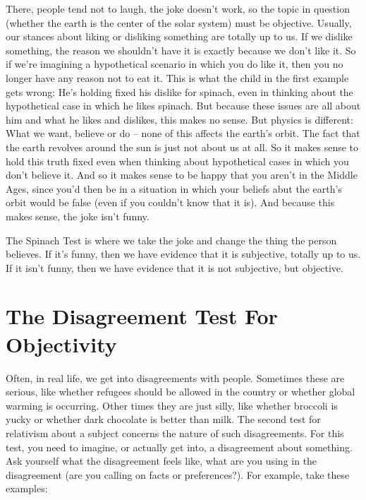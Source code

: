 There, people tend not to laugh, the joke doesn't work, so the topic in question (whether the earth is the center of the solar system) must be objective. Usually, our stances about liking or disliking something are totally up to us. If we dislike something, the reason we shouldn’t have it is exactly because we don’t like it. So if we're imagining a hypothetical scenario in which you do like it, then you no longer have any reason not to eat it. This is what the child in the first example gets wrong: He's holding fixed his dislike for spinach, even in thinking about the hypothetical case in which he likes spinach. But because these issues are all about him and what he likes and dislikes, this makes no sense. But physics is different: What we want, believe or do – none of this affects the earth’s orbit. The fact that the earth revolves around the sun is just not about us at all. So it makes sense to hold this truth fixed even when thinking about hypothetical cases in which you don't believe it. And so it makes sense to be happy that you aren’t in the Middle Ages, since you’d then be in a situation in which your beliefs abut the earth’s orbit would be false (even if you couldn’t know that it is). And because this makes sense, the joke isn't funny.

The Spinach Test is where we take the joke and change the thing the person believes. If it’s funny, then we have evidence that it is subjective, totally up to us. If it isn’t funny, then we have evidence that it is not subjective, but objective.

\section{The Disagreement Test For Objectivity}

Often, in real life, we get into disagreements with people. Sometimes these are serious, like whether refugees should be allowed in the country or whether global warming is occurring. Other times they are just silly, like whether broccoli is yucky or whether dark chocolate is better than milk. The second test for relativism about a subject concerns the nature of such disagreements. For this test, you need to  imagine, or actually get into, a disagreement about something. Ask yourself what the disagreement feels like, what are you using in the disagreement (are you calling on facts or preferences?). For example, take these examples:

